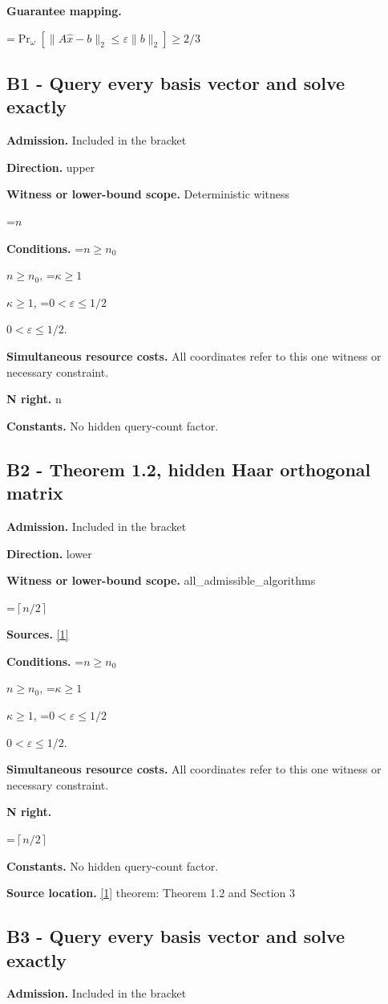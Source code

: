 \documentclass[10pt,a4paper]{article}
\newcommand{\AtlasMath}[1]{\par\begingroup\centering\setbox0=\hbox{$\displaystyle #1$}\ifdim\wd0>1.4\linewidth\typeout{ATLAS WIDE FORMULA: \the\wd0}\fi\ifdim\wd0>\linewidth\resizebox{\linewidth}{!}{\box0}\else\box0\fi\par\endgroup}
\newcommand{\AtlasInlineMath}[1]{\begingroup\setbox0=\hbox{$#1$}\ifdim\wd0>.4\linewidth\endgroup\AtlasMath{#1}\else\endgroup$#1$\fi}
\begin{document}
\textbf{Guarantee mapping.}

\AtlasMath{\Pr_\omega[\|A\widehat x-b\|_2\le\varepsilon\|b\|_2]\ge 2/3}
\subsection{B1 - Query every basis vector and solve exactly}
\textbf{Admission.} Included in the bracket

\textbf{Direction.} upper

\textbf{Witness or lower-bound scope.} Deterministic witness

\AtlasMath{n}
\textbf{Conditions.} \AtlasInlineMath{n\ge n_0}, \AtlasInlineMath{\kappa\ge1}, \AtlasInlineMath{0<\varepsilon\le 1/2}.

\textbf{Simultaneous resource costs.} All coordinates refer to this one witness or necessary constraint.

\textbf{N right.} n

\textbf{Constants.} No hidden query-count factor.

\subsection{B2 - Theorem 1.2, hidden Haar orthogonal matrix}
\textbf{Admission.} Included in the bracket

\textbf{Direction.} lower

\textbf{Witness or lower-bound scope.} all\_admissible\_algorithms

\AtlasMath{\left\lceil n/2\right\rceil}
\textbf{Sources.} \href{https://arxiv.org/abs/2602.04842}{[1]}

\textbf{Conditions.} \AtlasInlineMath{n\ge n_0}, \AtlasInlineMath{\kappa\ge1}, \AtlasInlineMath{0<\varepsilon\le 1/2}.

\textbf{Simultaneous resource costs.} All coordinates refer to this one witness or necessary constraint.

\textbf{N right.}

\AtlasMath{\left\lceil n/2\right\rceil}
\textbf{Constants.} No hidden query-count factor.

\textbf{Source location.} \href{https://arxiv.org/abs/2602.04842}{[1]} theorem: Theorem 1.2 and Section 3

\subsection{B3 - Query every basis vector and solve exactly}
\textbf{Admission.} Included in the bracket
\end{document}
